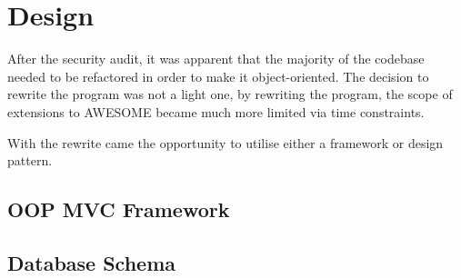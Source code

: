 \chapter{Design}
	
	After the security audit, it was apparent that the majority of the codebase needed to be refactored in order to make it object-oriented.
	The decision to rewrite the program was not a light one, by rewriting the program, the scope of extensions to \ac{AWESOME} became much more limited via time constraints.
	
	With the rewrite came the opportunity to utilise either a framework or design pattern.
	
	\section{OOP MVC Framework}
	
	\section{Database Schema}
	
	
